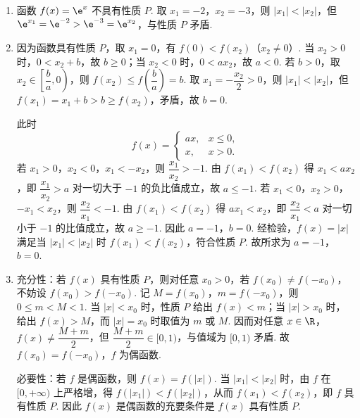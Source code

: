 \documentclass[UTF8,a4paper,oneside,11pt]{ctexbook}
\begin{document}
\begin{solution}
\begin{enumerate}
\item 函数 \(f(x)=\e^x\) 不具有性质 \(P\). 取 \(x_1=-2\)，\(x_2=-3\)，则 \(|x_1|<|x_2|\)，但 \(\e^{x_1}=\e^{-2}>\e^{-3}=\e^{x_2}\)，与性质 \(P\) 矛盾.

\item 因为函数具有性质 \(P\)，取 \(x_1=0\)，有 \(f(0)<f(x_2)\)（\(x_2\ne0\)）. 当 \(x_2>0\) 时，\(0<x_2+b\)，故 \(b\ge0\)；当 \(x_2<0\) 时，\(0<ax_2\)，故 \(a<0\). 若 \(b>0\)，取 \(x_2\in\left[\dfrac{b}{a},0\right)\)，则 \(f(x_2)\le f\left(\dfrac{b}{a}\right)=b\). 取 \(x_1=-\dfrac{x_2}{2}>0\)，则 \(|x_1|<|x_2|\)，但 \(f(x_1)=x_1+b>b\ge f(x_2)\)，矛盾，故 \(b=0\).

此时
\[
f(x)=
\begin{cases}
ax,&x\le0,\\
x,&x>0.
\end{cases}
\]
若 \(x_1>0\)，\(x_2<0\)，\(x_1<-x_2\)，则 \(\dfrac{x_1}{x_2}>-1\). 由 \(f(x_1)<f(x_2)\) 得 \(x_1<ax_2\)，即 \(\dfrac{x_1}{x_2}>a\) 对一切大于 \(-1\) 的负比值成立，故 \(a\le-1\). 若 \(x_1<0\)，\(x_2>0\)，\(-x_1<x_2\)，则 \(\dfrac{x_2}{x_1}<-1\). 由 \(f(x_1)<f(x_2)\) 得 \(ax_1<x_2\)，即 \(\dfrac{x_2}{x_1}<a\) 对一切小于 \(-1\) 的比值成立，故 \(a\ge-1\). 因此 \(a=-1\)，\(b=0\). 经检验，\(f(x)=|x|\) 满足当 \(|x_1|<|x_2|\) 时 \(f(x_1)<f(x_2)\)，符合性质 \(P\). 故所求为 \(a=-1\)，\(b=0\).

\item 充分性：若 \(f(x)\) 具有性质 \(P\)，则对任意 \(x_0>0\)，若 \(f(x_0)\ne f(-x_0)\)，不妨设 \(f(x_0)>f(-x_0)\). 记 \(M=f(x_0)\)，\(m=f(-x_0)\)，则 \(0\le m<M<1\). 当 \(|x|<x_0\) 时，性质 \(P\) 给出 \(f(x)<m\)；当 \(|x|>x_0\) 时，给出 \(f(x)>M\)，而 \(|x|=x_0\) 时取值为 \(m\) 或 \(M\). 因而对任意 \(x\in\R\)，\(f(x)\ne\dfrac{M+m}{2}\)，但 \(\dfrac{M+m}{2}\in[0,1)\)，与值域为 \([0,1)\) 矛盾. 故 \(f(x_0)=f(-x_0)\)，\(f\) 为偶函数.

必要性：若 \(f\) 是偶函数，则 \(f(x)=f(|x|)\). 当 \(|x_1|<|x_2|\) 时，由 \(f\) 在 \([0,+\infty)\) 上严格增，得 \(f(|x_1|)<f(|x_2|)\)，从而 \(f(x_1)<f(x_2)\)，即 \(f\) 具有性质 \(P\). 因此 \(f(x)\) 是偶函数的充要条件是 \(f(x)\) 具有性质 \(P\).
\end{enumerate}
\end{solution}

\end{document}
